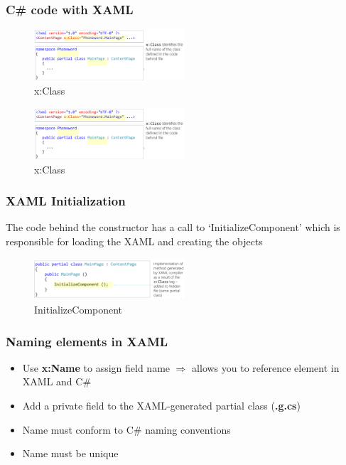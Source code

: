 \documentclass{article}
\newcommand{\bold}[1]{\textbf{#1}}
\begin{document}
\subsubsection{C\# code with XAML}

\begin{figure}[H]
    \centering
    \includegraphics[width=0.5\textwidth]{xaml05.png}
    \caption{x:Class}
\end{figure}

\begin{figure}[H]
    \centering
    \includegraphics[width=0.5\textwidth]{xaml05.png}
    \caption{x:Class}
\end{figure}

\subsubsection{XAML Initialization}

The code behind the constructor has a call to `InitializeComponent' which is responsible for loading the XAML and creating the objects

\begin{figure}[H]
    \centering
    \includegraphics[width=0.5\textwidth]{xaml06.png}
    \caption{InitializeComponent}
\end{figure}

\subsubsection{Naming elements in XAML}

\begin{itemize}
    \item Use \bold{x:Name} to assign field name $\Rightarrow$ allows you to reference element in XAML and C\#
    \item Add a private field to the XAML-generated partial class (\bold{.g.cs})
    \item Name must conform to C\# naming conventions
    \item Name must be unique 
\end{itemize}
\end{document}

